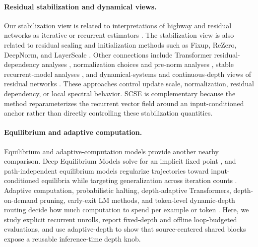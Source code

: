 \documentclass[letterpaper]{article} %
\newcommand{\SCSE}{\textsc{SCSE}}
\theoremstyle{remark}
\begin{document}
\paragraph{Residual stabilization and dynamical views.} Our stabilization view is related to interpretations of highway and residual networks as iterative or recurrent estimators \citep{srivastava2015highway,liao2016bridging,greff2017highway,jastrzebski2018residual}.  The stabilization view is also related to residual scaling and initialization methods such as Fixup, ReZero, DeepNorm, and LayerScale \citep{zhang2019fixup,bachlechner2021rezero,wang2022deepnet,touvron2021going}.  Other connections include Transformer residual-dependency analyses \citep{liu2020understanding}, normalization choices and pre-norm analyses \citep{ba2016layer,zhang2019rmsnorm,nguyen2019transformers,xiong2020layer}, stable recurrent-model analyses \citep{pascanu2013difficulty,miller2019stable,chang2019antisymmetric,erichson2021lipschitz}, and dynamical-systems and continuous-depth views of residual networks \citep{haber2017stable,chen2018neuralode}.  These approaches control update scale, normalization, residual dependency, or local spectral behavior.  \SCSE{} is complementary because the method reparameterizes the recurrent vector field around an input-conditioned anchor rather than directly controlling these stabilization quantities.

\paragraph{Equilibrium and adaptive computation.} Equilibrium and adaptive-computation models provide another nearby comparison.  Deep Equilibrium Models solve for an implicit fixed point \citep{bai2019deq}, and path-independent equilibrium models regularize trajectories toward input-conditioned equilibria while targeting generalization across iteration counts \citep{anil2022path}.  Adaptive computation, probabilistic halting, depth-adaptive Transformers, depth-on-demand pruning, early-exit LM methods, and token-level dynamic-depth routing decide how much computation to spend per example or token \citep{graves2016act,banino2021pondernet,elbayad2020depth,fan2020layerdrop,schuster2022calm,raposo2024mixture}.  Here, we study explicit recurrent unrolls, report fixed-depth and offline loop-budgeted evaluations, and use adaptive-depth to show that source-centered shared blocks expose a reusable inference-time depth knob.
\end{document}
